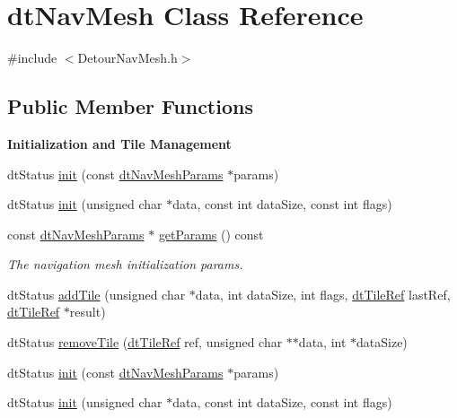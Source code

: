 \hypertarget{classdtNavMesh}{}\section{dt\+Nav\+Mesh Class Reference}
\label{classdtNavMesh}


{\ttfamily \#include $<$Detour\+Nav\+Mesh.\+h$>$}

\subsection*{Public Member Functions}
\begin{Indent}\textbf{ Initialization and Tile Management}\par
\begin{DoxyCompactItemize}
\item 
dt\+Status \hyperlink{classdtNavMesh_a020702938951249972b955a65967234a}{init} (const \hyperlink{structdtNavMeshParams}{dt\+Nav\+Mesh\+Params} $\ast$params)
\item 
dt\+Status \hyperlink{classdtNavMesh_a3cbc598755db0d1e9541b15f0f464318}{init} (unsigned char $\ast$data, const int data\+Size, const int flags)
\item 
const \hyperlink{structdtNavMeshParams}{dt\+Nav\+Mesh\+Params} $\ast$ \hyperlink{classdtNavMesh_a9202ff1b571f26d948c0ee2f07c9bce8}{get\+Params} () const
\begin{DoxyCompactList}\small\item\em The navigation mesh initialization params. \end{DoxyCompactList}\item 
dt\+Status \hyperlink{classdtNavMesh_a5b5a7c4fa72c08d9a6d4cc4d8cd3bb89}{add\+Tile} (unsigned char $\ast$data, int data\+Size, int flags, \hyperlink{group__detour_ga7ea56cfe01bd7c34a81d821d94cbeea5}{dt\+Tile\+Ref} last\+Ref, \hyperlink{group__detour_ga7ea56cfe01bd7c34a81d821d94cbeea5}{dt\+Tile\+Ref} $\ast$result)
\item 
dt\+Status \hyperlink{classdtNavMesh_a5ca09946d00f1cee4987ed5e2f999fdb}{remove\+Tile} (\hyperlink{group__detour_ga7ea56cfe01bd7c34a81d821d94cbeea5}{dt\+Tile\+Ref} ref, unsigned char $\ast$$\ast$data, int $\ast$data\+Size)
\item 
dt\+Status \hyperlink{classdtNavMesh_a020702938951249972b955a65967234a}{init} (const \hyperlink{structdtNavMeshParams}{dt\+Nav\+Mesh\+Params} $\ast$params)
\item 
dt\+Status \hyperlink{classdtNavMesh_a3cbc598755db0d1e9541b15f0f464318}{init} (unsigned char $\ast$data, const int data\+Size, const int flags)
$$
\end{DoxyCompactItemize}
\end{Indent}

